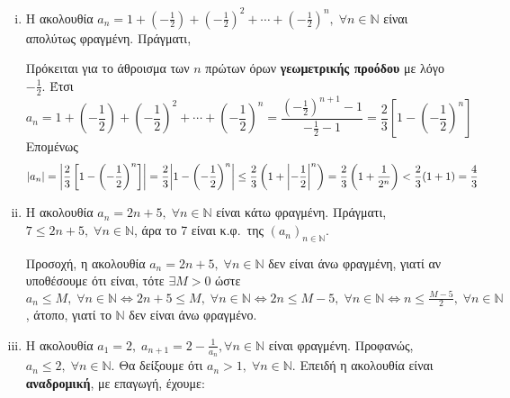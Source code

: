 \documentclass[a4paper,table]{report}
\begin{document}
\begin{examples}
\begin{enumerate}[i)]
    \item Η ακολουθία $ a_{n}= 1 + \left(- \frac{1}{2} \right) + \left(- 
        \frac{1}{2}\right)^{2} + \cdots + \left(-\frac{1}{2} 
      \right) ^{n}, 
      \; \forall n \in \mathbb{N} $ είναι απολύτως φραγμένη. Πράγματι,

      Πρόκειται για το άθροισμα των $ n $ πρώτων όρων \textbf{γεωμετρικής προόδου} με 
      λόγο $ -\frac{1}{2} $. Έτσι
      \[ a_{n} = 1 + \left(- \frac{1}{2}\right) + \left(- \frac{1}{2} 
        \right)^{2} + \cdots + \left(- \frac{1}{2} \right)^{n} = 
        \frac{(- \frac{1}{2} )^{n+1}-1}{- \frac{1}{2}-1} = 
      \frac{2}{3} \left[1 - \left(- \frac{1}{2} \right)^{n}\right] \]
      Επομένως
      \[
        \abs{a_{n}} = \abs{\frac{2}{3} \left[1-\left(- \frac{1}{2} \right)^{n}
            \right]} = \frac{2}{3} \abs{1 - \left(- 
        \frac{1}{2}\right)^{n}} \leq 
        \frac{2}{3} \left(1 + \abs{-\frac{1}{2} }^{n} \right) = 
        \frac{2}{3} \left(1+ \frac{1}{2^{n}}\right) < \frac{2}{3}
        (1+1) = \frac{4}{3} 
      \] 

    \item Η ακολουθία $ a_{n}= 2n+5, \; \forall n \in \mathbb{N} $ είναι κάτω 
      φραγμένη.
      Πράγματι, $ 7 \leq 2n+5, \; \forall n \in \mathbb{N} $, άρα το 
      7 είναι κ.φ.\ της $ (a_{n} )_{n \in \mathbb{N}} $.

      Προσοχή, η ακολουθία $ a_{n}= 2n+5, \; \forall n \in \mathbb{N} $ δεν είναι 
      άνω φραγμένη, γιατί αν υποθέσουμε ότι είναι, τότε $ \exists M>0 $ ώστε 
      $ a_{n} \leq M, \; \forall n \in \mathbb{N} 
      \Leftrightarrow 2n+5 \leq M, \; \forall n \in \mathbb{N} 
      \Leftrightarrow 2n \leq M-5, \; \forall n \in \mathbb{N}
      \Leftrightarrow n \leq \frac{M-5}{2}, \; \forall n \in \mathbb{N} $, άτοπο, 
      γιατί το $ \mathbb{N} $ δεν είναι άνω φραγμένο.

    \item Η ακολουθία $ a_{1}=2, \; a_{n+1}=2 - \frac{1}{a_{n}}, \forall n \in 
      \mathbb{N}$
      είναι φραγμένη. Προφανώς, $ a_{n}\leq 2, \; \forall n \in \mathbb{N} $.
      Θα δείξουμε ότι $ a_{n}>1, \; \forall n \in \mathbb{N} $. Επειδή η ακολουθία 
      είναι \textbf{αναδρομική}, με επαγωγή, έχουμε:


\end{enumerate}
\end{examples}
\end{document}
